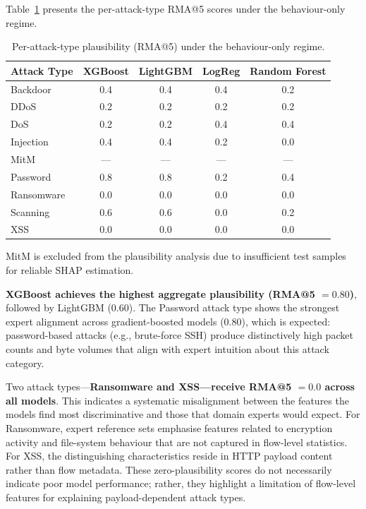 \documentclass[12pt,a4paper]{report}
\begin{document}
Table~\ref{tab:plausibility} presents the per-attack-type RMA@5 scores under the behaviour-only regime.

\begin{table}[H]
\centering
\caption{Per-attack-type plausibility (RMA@5) under the behaviour-only regime.}
\label{tab:plausibility}
\begin{tabular}{lcccc}
\toprule
\textbf{Attack Type} & \textbf{XGBoost} & \textbf{LightGBM} & \textbf{LogReg} & \textbf{Random Forest} \\
\midrule
Backdoor & 0.4 & 0.4 & 0.4 & 0.2 \\
DDoS & 0.2 & 0.2 & 0.2 & 0.2 \\
DoS & 0.2 & 0.2 & 0.4 & 0.4 \\
Injection & 0.4 & 0.4 & 0.2 & 0.0 \\
MitM & --- & --- & --- & --- \\
Password & 0.8 & 0.8 & 0.2 & 0.4 \\
Ransomware & 0.0 & 0.0 & 0.0 & 0.0 \\
Scanning & 0.6 & 0.6 & 0.0 & 0.2 \\
XSS & 0.0 & 0.0 & 0.0 & 0.0 \\
\bottomrule
\end{tabular}
\end{table}

MitM is excluded from the plausibility analysis due to insufficient test samples for reliable SHAP estimation.

\textbf{XGBoost achieves the highest aggregate plausibility (RMA@5 $= 0.80$)}, followed by LightGBM (0.60). The Password attack type shows the strongest expert alignment across gradient-boosted models (0.80), which is expected: password-based attacks (e.g., brute-force SSH) produce distinctively high packet counts and byte volumes that align with expert intuition about this attack category.

Two attack types---\textbf{Ransomware and XSS---receive RMA@5 $= 0.0$ across all models}. This indicates a systematic misalignment between the features the models find most discriminative and those that domain experts would expect. For Ransomware, expert reference sets emphasise features related to encryption activity and file-system behaviour that are not captured in flow-level statistics. For XSS, the distinguishing characteristics reside in HTTP payload content rather than flow metadata. These zero-plausibility scores do not necessarily indicate poor model performance; rather, they highlight a limitation of flow-level features for explaining payload-dependent attack types.
\end{document}
